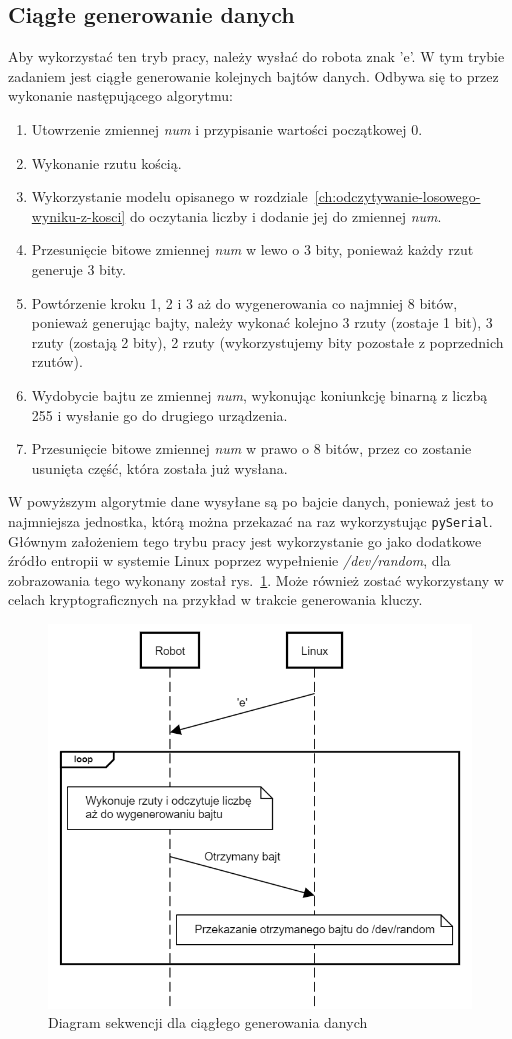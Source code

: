 \subsection{Ciągłe generowanie danych}
Aby wykorzystać ten tryb pracy, należy wysłać do robota znak 'e'.
W tym trybie zadaniem jest ciągłe generowanie kolejnych bajtów danych.
Odbywa się to przez wykonanie następującego algorytmu:
\begin{enumerate}
    \item Utowrzenie zmiennej \textit{num} i przypisanie wartości początkowej 0.
    \item Wykonanie rzutu kością.
    \item Wykorzystanie modelu opisanego w rozdziale~\ref{ch:odczytywanie-losowego-wyniku-z-kosci} do oczytania liczby i dodanie jej do zmiennej \textit{num}.
    \item Przesunięcie bitowe zmiennej \textit{num} w lewo o 3 bity, ponieważ każdy rzut generuje 3 bity.
    \item Powtórzenie kroku 1, 2 i 3 aż do wygenerowania co najmniej 8 bitów, ponieważ generując bajty, należy wykonać
    kolejno 3 rzuty (zostaje 1 bit), 3 rzuty (zostają 2 bity), 2 rzuty (wykorzystujemy bity pozostałe z poprzednich rzutów).
    \item Wydobycie bajtu ze zmiennej \textit{num}, wykonując koniunkcję binarną z liczbą 255 i wysłanie go do drugiego urządzenia.
    \item Przesunięcie bitowe zmiennej \textit{num} w prawo o 8 bitów, przez co zostanie usunięta część, która została już wysłana.
\end{enumerate}

W powyższym algorytmie dane wysyłane są po bajcie danych, ponieważ jest to najmniejsza jednostka, 
którą można przekazać na raz wykorzystując \texttt{pySerial}.
Głównym założeniem tego trybu pracy jest wykorzystanie go jako dodatkowe źródło entropii w systemie 
Linux poprzez wypełnienie \textit{/dev/random}, dla zobrazowania tego wykonany został rys.~\ref{fig:interface_a}. Może również zostać wykorzystany w celach 
kryptograficznych na przykład w trakcie generowania kluczy.

\begin{figure}[H]
    \centering
    \includegraphics[width=0.5\linewidth]{chapters/05-Przetwarzanie Wyniku/figures/InterfaceA}
    \caption{Diagram sekwencji dla ciągłego generowania danych}
    \label{fig:interface_a}
\end{figure}

